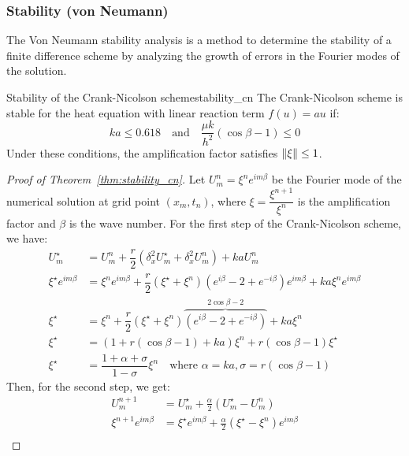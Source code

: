 \subsubsection{Stability (von Neumann)}
The Von Neumann stability analysis is a method to determine the stability of a finite difference scheme by analyzing the growth of errors in the Fourier modes of the solution.
\begin{theorem}{Stability of the Crank-Nicolson scheme}{stability_cn}
  The Crank-Nicolson scheme is stable for the heat equation with linear reaction term \(f(u) = au\) if:
  \[
    ka \leq 0.618 \quad \text{and} \quad \frac{\mu k}{h^2}(\cos\beta - 1) \leq 0
  \]
  Under these conditions, the amplification factor satisfies \(\lVert\xi\rVert \leq 1\).
\end{theorem}
\begin{proof}[Proof of Theorem~\ref{thm:stability_cn}]
  Let \(U_m^n = \xi^n e^{i m \beta}\) be the Fourier mode of the numerical solution at grid point \((x_m, t_n)\), where \(\xi=\dfrac{\xi^{n+1}}{\xi^n}\) is the amplification factor and \(\beta\) is the wave number.
  For the first step of the Crank-Nicolson scheme, we have:
  \begin{align*}
    U_m^\star               & = U_m^n + \dfrac{r}{2} (\delta_x^2 U_m^\star + \delta_x^2 U_m^n) + k a U_m^n                                                                     \\
    \xi^\star e^{i m \beta} & = \xi^n e^{i m \beta} + \dfrac{r}{2} \left(\xi^\star + \xi^n\right)\left(e^{i\beta} - 2 + e^{-i\beta}\right)e^{im\beta}+ k a \xi^n e^{i m \beta} \\
    \xi^\star               & = \xi^n + \dfrac{r}{2} \left(\xi^\star + \xi^n \right)\overbrace{\left(e^{i \beta} - 2 + e^{-i \beta}\right)}^{2\cos\beta - 2} + k a \xi^n       \\
    \xi^\star               & = (1 + r(\cos\beta - 1) + ka) \xi^n + r(\cos\beta - 1)\xi^\star                                                                                  \\
    \xi^\star               & = \dfrac{1 + \alpha + \sigma}{1 - \sigma} \xi^n \quad \text{where } \alpha = ka, \sigma = r(\cos\beta - 1)
  \end{align*}
  Then, for the second step, we get:
  \begin{align*}
    U_m^{n+1}               & = U_m^\star + \tfrac{\alpha}{2}(U_m^\star - U_m^n)                                                                      \\
    \xi^{n+1} e^{i m \beta} & = \xi^\star e^{i m \beta} + \tfrac{\alpha}{2}(\xi^\star - \xi^n)e^{i m \beta}                                           \\

\end{align*}
\end{proof}

